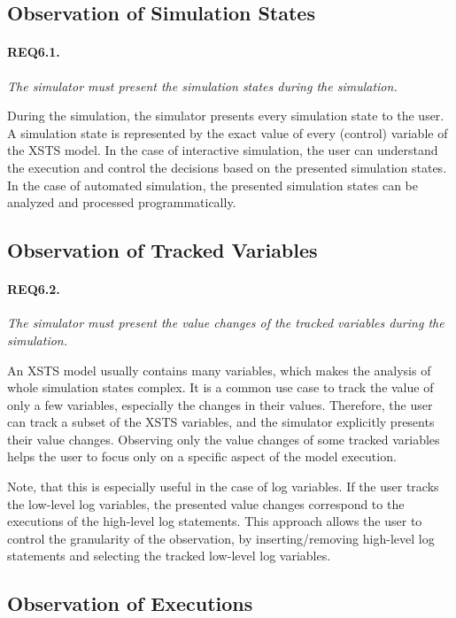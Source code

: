 \subsection{Observation of Simulation States}

\paragraph{REQ6.1.} \textit{The simulator must present the simulation states during the simulation.}

During the simulation, the simulator presents every simulation state to the user. A simulation state is represented by the exact value of every (control) variable of the XSTS model. In the case of interactive simulation, the user can understand the execution and control the decisions based on the presented simulation states. In the case of automated simulation, the presented simulation states can be analyzed and processed programmatically.

\subsection{Observation of Tracked Variables}

\paragraph{REQ6.2.} \textit{The simulator must present the value changes of the tracked variables during the simulation.}

An XSTS model usually contains many variables, which makes the analysis of whole simulation states complex. It is a common use case to track the value of only a few variables, especially the changes in their values. Therefore, the user can track a subset of the XSTS variables, and the simulator explicitly presents their value changes. Observing only the value changes of some tracked variables helps the user to focus only on a specific aspect of the model execution.

Note, that this is especially useful in the case of log variables. If the user tracks the low-level log variables, the presented value changes correspond to the executions of the high-level log statements. This approach allows the user to control the granularity of the observation, by inserting/removing high-level log statements and selecting the tracked low-level log variables.

\subsection{Observation of Executions}

